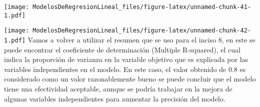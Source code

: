 \documentclass[
]{article}
\newenvironment{Shaded}{\begin{snugshade}}{\end{snugshade}}
\newcommand{\AttributeTok}[1]{\textcolor[rgb]{0.77,0.63,0.00}{#1}}
\newcommand{\FunctionTok}[1]{\textcolor[rgb]{0.00,0.00,0.00}{#1}}
\newcommand{\NormalTok}[1]{#1}
\newcommand{\SpecialCharTok}[1]{\textcolor[rgb]{0.00,0.00,0.00}{#1}}
\newcommand{\StringTok}[1]{\textcolor[rgb]{0.31,0.60,0.02}{#1}}
\begin{document}
\texttt{[image: ModelosDeRegresionLineal\_files/figure-latex/unnamed-chunk-41-1.pdf]}

\begin{Shaded}
\end{Shaded}

\texttt{[image: ModelosDeRegresionLineal\_files/figure-latex/unnamed-chunk-42-1.pdf]}
Vamos a volver a utilizar el resumen que se uso para el inciso 8, en
este se puede encontrar el coeficiente de determinación (Multiple
R-squared), el cual indica la proporción de varianza en la variable
objetivo que es explicada por las variables independientes en el modelo.
En este caso, el valor obtenido de 0.8 es considerado como un valor
razonablemente bueno se puede concluir que el modelo tiene una
efectividad aceptable, aunque se podría trabajar en la mejora de algunas
variables independientes para aumentar la precisión del modelo.
\end{document}
